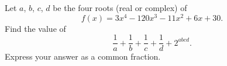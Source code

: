 Let $a$, $b$, $c$, $d$ be the four roots (real or complex) of
\[
f(x)=3x^4-120x^3-11x^2+6x+30 .
\]
Find the value of
\[
\dfrac{1}{a}+\dfrac{1}{b}+\dfrac{1}{c}+\dfrac{1}{d}+2^{abcd}.
\]
Express your answer as a common fraction.
